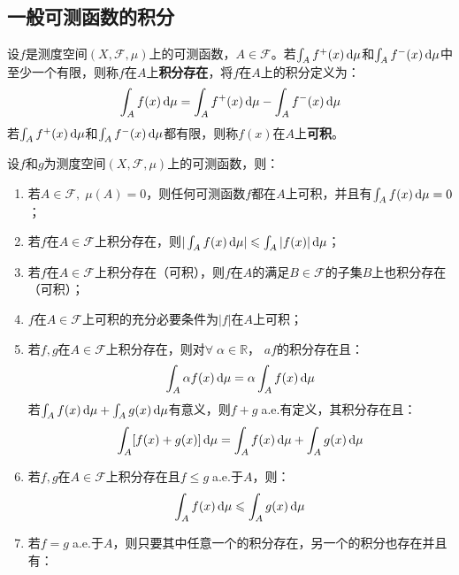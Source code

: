\subsection{一般可测函数的积分}
\begin{definition}
	设$f$是测度空间$(X,\mathscr{F},\mu)$上的可测函数，$A\in \mathscr{F}$。若$\int_{A}f^+(x)\mathop{}\!\mathrm{d}\mu$和$\int_{A}f^-(x)\mathop{}\!\mathrm{d}\mu$中至少一个有限，则称$f$在$A$上\textbf{积分存在}，将$f$在$A$上的积分定义为：
	\begin{equation*}
		\int_{A}f(x)\mathop{}\!\mathrm{d}\mu=\int_{A}f^+(x)\mathop{}\!\mathrm{d}\mu-\int_{A}f^-(x)\mathop{}\!\mathrm{d}\mu
	\end{equation*}
	若$\int_{A}f^+(x)\mathop{}\!\mathrm{d}\mu$和$\int_{A}f^-(x)\mathop{}\!\mathrm{d}\mu$都有限，则称$f(x)$在$A$上\textbf{可积}。
\end{definition}
\begin{property}\label{prop:MeasurableIntegral}
	设$f$和$g$为测度空间$(X,\mathscr{F},\mu)$上的可测函数，则：
	\begin{enumerate}
		\item 若$A\in \mathscr{F},\;\mu(A)=0$，则任何可测函数$f$都在$A$上可积，并且有$\int_{A}f(x)\mathop{}\!\mathrm{d}\mu=0$；
		\item 若$f$在$A\in \mathscr{F}$上积分存在，则$|\int_{A}f(x)\mathop{}\!\mathrm{d}\mu|\leqslant\int_{A}|f(x)|\mathop{}\!\mathrm{d}\mu$；
		\item 若$f$在$A\in \mathscr{F}$上积分存在（可积），则$f$在$A$的满足$B\in\mathscr{F}$的子集$B$上也积分存在（可积）；
		\item $f$在$A\in \mathscr{F}$上可积的充分必要条件为$|f|$在$A$上可积；
		\item 若$f,g$在$A\in \mathscr{F}$上积分存在，则对$\forall\;\alpha\in\mathbb{R}$， $af$的积分存在且：
		\begin{equation*}
			\int_{A}\alpha f(x)\mathop{}\!\mathrm{d}\mu=\alpha\int_{A}f(x)\mathop{}\!\mathrm{d}\mu
		\end{equation*}
		若$\int_{A}f(x)\mathop{}\!\mathrm{d}\mu+\int_{A}g(x)\mathop{}\!\mathrm{d}\mu$有意义，则$f+g\;$a.e.有定义，其积分存在且：
		\begin{equation*}
			\int_{A}[f(x)+g(x)]\mathop{}\!\mathrm{d}\mu=\int_{A}f(x)\mathop{}\!\mathrm{d}\mu+\int_{A}g(x)\mathop{}\!\mathrm{d}\mu
		\end{equation*}
		\item 若$f,g$在$A\in\mathscr{F}$上积分存在且$f\leqslant g\;$a.e.于$A$，则：
		\begin{equation*}
			\int_{A}f(x)\mathop{}\!\mathrm{d}\mu\leqslant\int_{A}g(x)\mathop{}\!\mathrm{d}\mu
		\end{equation*}
		\item 若$f=g\;$a.e.于$A$，则只要其中任意一个的积分存在，另一个的积分也存在并且有：
		\begin{equation*}

\end{equation*}
\end{enumerate}
\end{property}
